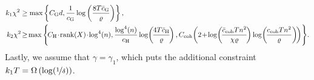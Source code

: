 \documentclass[11pt]{article}
\theoremstyle{definition}
\theoremstyle{plain}
\begin{document}
\begin{align}
    \label{eq:choices_k1_k_2}
    k_1 \chi^2 &\geq \max\left\{C_{\mathrm{G}} d, \frac{1}{c_{\mathrm{G}}}\log\left(\frac{8T\bar{c}_{\mathrm{G}}}{\varrho}\right)\right\},\\ 
    k_2\chi^2 \hspace{-0.15em}&\ge\hspace{-0.15em} \max\Bigg\{\hspace{-0.15em}C_{\mathrm{H}} \hspace{-0.15em}\cdot\hspace{-0.15em} \mathrm{rank}(X)\hspace{-0.15em}\cdot\hspace{-0.15em} \log^4(n),\frac{\log^4(n)}{c_{\mathrm{H}}}\log\hspace{-0.15em}\left(\hspace{-0.15em}\frac{4T\bar{c}_{\mathrm{H}}}{\varrho}\hspace{-0.15em}\right), C_{\mathrm{coh}}\hspace{-0.15em}\left(2\hspace{-0.15em}+\hspace{-0.15em}\log\hspace{-0.15em}\left(\hspace{-0.15em}\frac{\bar{c}_{\mathrm{coh}} T n^2}{\chi\varrho}\hspace{-0.15em}\right)\log\hspace{-0.15em}\left(\hspace{-0.15em}\frac{c_{\mathrm{coh}} T n^2}{\varrho}\right)\hspace{-0.15em}\right)\hspace{-0.15em}\Bigg\}.
\end{align}
Lastly, we assume that $\gamma = \gamma_1$, which puts the additional constraint $k_1T = \Omega\left(\log(\nicefrac{1}{\delta})\right)$. 
\end{document}

